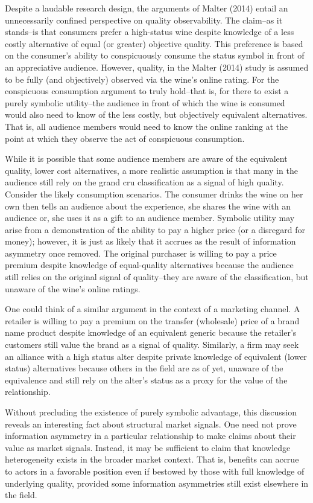 Despite a laudable research design, the arguments of Malter (2014) entail an unnecessarily confined perspective on quality observability. The claim--as it stands--is that consumers prefer a high-status wine despite knowledge of a less costly alternative of equal (or greater) objective quality. This preference is based on the consumer's ability to conspicuously consume the status symbol in front of an appreciative audience. However, quality, in the Malter (2014) study is assumed to be fully (and objectively) observed via the wine's online rating. For the conspicuous consumption argument to truly hold--that is, for there to exist a purely symbolic utility--the audience in front of which the wine is consumed would also need to know of the less costly, but objectively equivalent alternatives. That is, all audience members would need to know the online ranking at the point at which they observe the act of conspicuous consumption.

While it is possible that some audience members are aware of the equivalent quality, lower cost alternatives, a more realistic assumption is that many in the audience still rely on the grand cru classification as a signal of high quality. Consider the likely consumption scenarios. The consumer drinks the wine on her own then tells an audience about the experience, she shares the wine with an audience or, she uses it as a gift to an audience member. Symbolic utility may arise from a demonstration of the ability to pay a higher price (or a disregard for money); however, it is just as likely that it accrues as the result of information asymmetry once removed. The original purchaser is willing to pay a price premium despite knowledge of equal-quality alternatives because the audience still relies on the original signal of quality--they are aware of the classification, but unaware of the wine's online ratings. 

One could think of a similar argument in the context of a marketing channel. A retailer is willing to pay a premium on the transfer (wholesale) price of a brand name product despite knowledge of an equivalent generic because the retailer's customers still value the brand as a signal of quality. Similarly, a firm may seek an alliance with a high status alter despite private knowledge of equivalent (lower status) alternatives because others in the field are as of yet, unaware of the equivalence and still rely on the alter's status as a proxy for the value of the relationship.  

Without precluding the existence of purely symbolic advantage, this discussion reveals an interesting fact about structural market signals. One need not prove information asymmetry in a particular relationship to make claims about their value as market signals. Instead, it may be sufficient to claim that knowledge heterogeneity exists in the broader market context. That is, benefits can accrue to actors in a favorable position even if bestowed by those with full knowledge of underlying quality, provided some information asymmetries still exist elsewhere in the field. 

